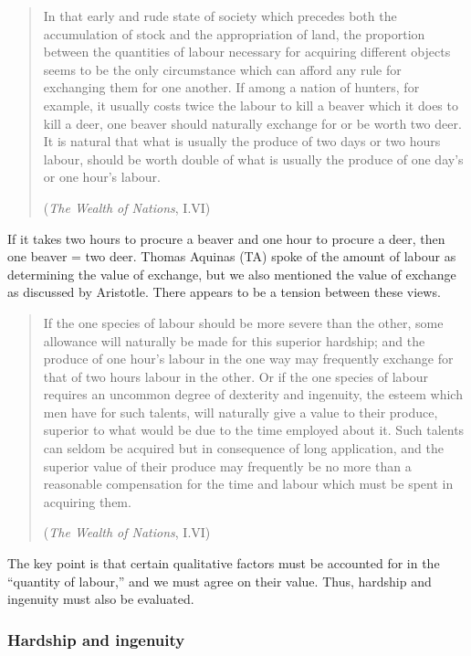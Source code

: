\begin{quote}
In that early and rude state of society which precedes both the accumulation of stock and the appropriation of land, the proportion between the quantities of labour necessary for acquiring different objects seems to be the only circumstance which can afford any rule for exchanging them for one another. If among a nation of hunters, for example, it usually costs twice the labour to kill a beaver which it does to kill a deer, one beaver should naturally exchange for or be worth two deer. It is natural that what is usually the produce of two days or two hours labour, should be worth double of what is usually the produce of one day’s or one hour’s labour.

(\textit{The Wealth of Nations}, I.VI)
\end{quote}

If it takes two hours to procure a beaver and one hour to procure a deer, then one beaver = two deer. Thomas Aquinas (TA) spoke of the amount of labour as determining the value of exchange, but we also mentioned the value of exchange as discussed by Aristotle. There appears to be a tension between these views.

\begin{quote}
If the one species of labour should be more severe than the other, some allowance will naturally be made for this superior hardship; and the produce of one hour’s labour in the one way may frequently exchange for that of two hours labour in the other. Or if the one species of labour requires an uncommon degree of dexterity and ingenuity, the esteem which men have for such talents, will naturally give a value to their produce, superior to what would be due to the time employed about it. Such talents can seldom be acquired but in consequence of long application, and the superior value of their produce may frequently be no more than a reasonable compensation for the time and labour which must be spent in acquiring them.

(\textit{The Wealth of Nations}, I.VI)
\end{quote}

The key point is that certain qualitative factors must be accounted for in the “quantity of labour,” and we must agree on their value. Thus, hardship and ingenuity must also be evaluated.

\subsubsection{Hardship and ingenuity}

